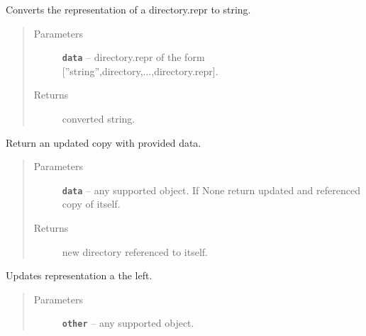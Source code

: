 \documentclass[letterpaper,10pt,english]{sphinxmanual}
\begin{document}
\begin{fulllineitems}
\begin{fulllineitems}
\begin{quote}
\begin{description}
\end{description}\end{quote}

\end{fulllineitems}


\begin{fulllineitems}
\label{RRtoolbox.lib:RRtoolbox.lib.directory.Directory.repr2str}
Converts the representation of a directory.repr to string.
\begin{quote}\begin{description}
\item[{Parameters}] \leavevmode
\textbf{\texttt{data}} -- directory.repr of the form {[}''string'',directory,...,directory.repr{]}.

\item[{Returns}] \leavevmode
converted string.

\end{description}\end{quote}

\end{fulllineitems}


\begin{fulllineitems}
\label{RRtoolbox.lib:RRtoolbox.lib.directory.Directory.update}
Return an updated copy with provided data.
\begin{quote}\begin{description}
\item[{Parameters}] \leavevmode
\textbf{\texttt{data}} -- any supported object.
If None return updated and referenced copy of itself.

\item[{Returns}] \leavevmode
new directory referenced to itself.

\end{description}\end{quote}

\end{fulllineitems}


\begin{fulllineitems}
\label{RRtoolbox.lib:RRtoolbox.lib.directory.Directory.update_left}
Updates representation a the left.
\begin{quote}\begin{description}
\item[{Parameters}] \leavevmode
\textbf{\texttt{other}} -- any supported object.


\end{description}
\end{quote}
\end{fulllineitems}
\end{fulllineitems}
\end{document}
